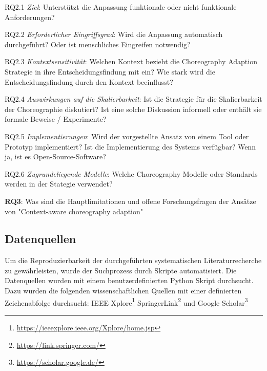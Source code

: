 \documentclass[conference,compsoc]{IEEEtran}
\begin{document}
RQ2.1 \textit{Ziel}: Unterstützt die Anpassung funktionale oder nicht funktionale Anforderungen?

RQ2.2 \textit{Erforderlicher Eingriffsgrad}: Wird die Anpassung automatisch durchgeführt? Oder ist menschliches Eingreifen notwendig?

RQ2.3 \textit{Kontextsensitivität}: Welchen Kontext bezieht die Choreography Adaption Strategie in ihre Entscheidungsfindung mit ein? Wie stark wird die Entscheidungsfindung durch den Kontext beeinflusst?

RQ2.4 \textit{Auswirkungen auf die Skalierbarkeit}: Ist die Strategie für die Skalierbarkeit der Choreographie diskutiert? Ist eine solche Diskussion informell oder enthält sie formale Beweise / Experimente?

RQ2.5 \textit{Implementierungen}: Wird der vorgestellte Ansatz von einem Tool oder Prototyp implementiert? Ist die Implementierung des Systems verfügbar? Wenn ja, ist es Open-Source-Software?

RQ2.6 \textit{Zugrundeliegende Modelle}: Welche Choreography Modelle oder Standards werden in der Stategie verwendet?

\textbf{RQ3}: Was sind die Hauptlimitationen und offene Forschungsfragen der Ansätze von "Context-aware choreography adaption"

%
%
%
%


\subsection{Datenquellen}
Um die Reproduzierbarkeit der durchgeführten systematischen Literaturrecherche zu gewährleisten, wurde der Suchprozess durch Skripte automatisiert. Die Datenquellen wurden mit einem benutzerdefinierten Python Skript durchsucht. Dazu wurden die folgenden wissenschaftlichen Quellen mit einer definierten Zeichenabfolge durchsucht: IEEE Xplore\footnote{\url{https://ieeexplore.ieee.org/Xplore/home.jsp}} SpringerLink\footnote{\url{https://link.springer.com/}} und Google Scholar\footnote{\url{https://scholar.google.de/}}
\end{document}
